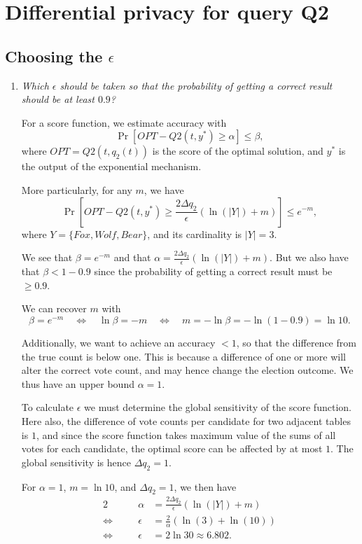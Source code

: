 \documentclass[parskip=half]{scrartcl}
\begin{document}
\section{Differential privacy for query Q2}

\subsection{Choosing the \texorpdfstring{$\epsilon$}{ε}}

\begin{enumerate}
    \item \textit{Which $\epsilon$ should be taken so that the probability of
    getting a correct result should be at least $0.9$?}

    For a score function, we estimate accuracy with
    $$
        \Pr[OPT - Q2(t, y^*) \ge \alpha] \le \beta,
    $$
    where $OPT=Q2(t, q_2(t))$ is the score of the optimal solution, and $y^*$ is
    the output of the exponential mechanism.
    
    More particularly, for any $m$, we have
    $$
        \Pr[OPT - Q2(t, y^*) \ge
        \frac{2\Delta q_2}{\epsilon}(\ln{(|Y|)} + m)] \le e^{-m},
    $$
    where $Y = \{Fox, Wolf, Bear\}$, and its cardinality is $|Y|=3$.

    We see that $\beta = e^{-m}$ and that $\alpha =
    \frac{2\Delta q_2}{\epsilon}(\ln{(|Y|)} + m)$. But we also have that
    $\beta < 1 - 0.9$ since the probability of getting a correct result must be
    $\ge 0.9$.

    We can recover $m$ with
    $$
        \beta = e^{-m} \quad\Leftrightarrow\quad
        \ln{\beta} = -m \quad\Leftrightarrow\quad
        m = -\ln{\beta} = -\ln{(1 - 0.9)}=\ln{10}.
    $$

    Additionally, we want to achieve an accuracy $<1$, so that the difference
    from the true count is below one. This is because a difference of one or
    more will alter the correct vote count, and may hence change the election
    outcome. We thus have an upper bound $\alpha=1$.

    To calculate $\epsilon$ we must determine the global sensitivity of the
    score function. Here also, the difference of vote counts per candidate
    for two adjacent tables is $1$, and since the score function takes maximum
    value of the sums of all votes for each candidate, the optimal score can
    be affected by at most $1$. The global sensitivity is hence
    $\Delta q_2 = 1$.

    For $\alpha = 1$, $m=\ln{10}$, and $\Delta q_2=1$, we then have
    \begin{alignat*}{2}
        \quad&& \alpha &= \frac{2\Delta q_2}{\epsilon}(\ln(|Y|) + m)\\
        \Leftrightarrow\quad&&
        \epsilon &= \frac{2}{\alpha}(\ln(3) + \ln(10))\\
        \Leftrightarrow\quad&&
        \epsilon &= 2 \ln{30} \approx 6.802.
    \end{alignat*}


\end{enumerate}
\end{document}
